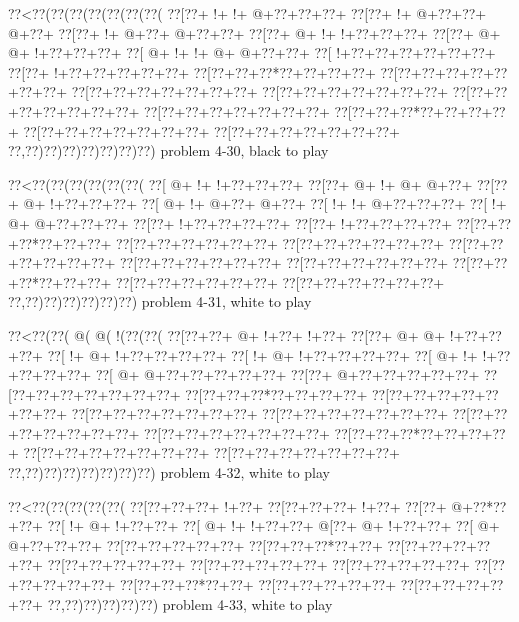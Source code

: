 \vbox{\vbox{\goo
\0??<\0??(\0??(\0??(\0??(\0??(\0??(\0??(
\0??[\0??+\- !+\- !+\- @+\0??+\0??+\0??+
\0??[\0??+\- !+\- @+\0??+\0??+\- @+\0??+
\0??[\0??+\- !+\- @+\0??+\- @+\0??+\0??+
\0??[\0??+\- @+\- !+\- !+\0??+\0??+\0??+
\0??[\0??+\- @+\- @+\- !+\0??+\0??+\0??+
\0??[\- @+\- !+\- !+\- @+\- @+\0??+\0??+
\0??[\- !+\0??+\0??+\0??+\0??+\0??+\0??+
\0??[\0??+\- !+\0??+\0??+\0??+\0??+\0??+
\0??[\0??+\0??+\0??*\0??+\0??+\0??+\0??+
\0??[\0??+\0??+\0??+\0??+\0??+\0??+\0??+
\0??[\0??+\0??+\0??+\0??+\0??+\0??+\0??+
\0??[\0??+\0??+\0??+\0??+\0??+\0??+\0??+
\0??[\0??+\0??+\0??+\0??+\0??+\0??+\0??+
\0??[\0??+\0??+\0??+\0??+\0??+\0??+\0??+
\0??[\0??+\0??+\0??*\0??+\0??+\0??+\0??+
\0??[\0??+\0??+\0??+\0??+\0??+\0??+\0??+
\0??[\0??+\0??+\0??+\0??+\0??+\0??+\0??+
\0??,\0??)\0??)\0??)\0??)\0??)\0??)\0??)
}
\hfil problem 4-30, black to play\hfil\break
}

\vbox{\vbox{\goo
\0??<\0??(\0??(\0??(\0??(\0??(\0??(
\0??[\- @+\- !+\- !+\0??+\0??+\0??+
\0??[\0??+\- @+\- !+\- @+\- @+\0??+
\0??[\0??+\- @+\- !+\0??+\0??+\0??+
\0??[\- @+\- !+\- @+\0??+\- @+\0??+
\0??[\- !+\- !+\- @+\0??+\0??+\0??+
\0??[\- !+\- @+\- @+\0??+\0??+\0??+
\0??[\0??+\- !+\0??+\0??+\0??+\0??+
\0??[\0??+\- !+\0??+\0??+\0??+\0??+
\0??[\0??+\0??+\0??*\0??+\0??+\0??+
\0??[\0??+\0??+\0??+\0??+\0??+\0??+
\0??[\0??+\0??+\0??+\0??+\0??+\0??+
\0??[\0??+\0??+\0??+\0??+\0??+\0??+
\0??[\0??+\0??+\0??+\0??+\0??+\0??+
\0??[\0??+\0??+\0??+\0??+\0??+\0??+
\0??[\0??+\0??+\0??*\0??+\0??+\0??+
\0??[\0??+\0??+\0??+\0??+\0??+\0??+
\0??[\0??+\0??+\0??+\0??+\0??+\0??+
\0??,\0??)\0??)\0??)\0??)\0??)\0??)
}
\hfil problem 4-31, white to play\hfil\break
}

\vbox{\vbox{\goo
\0??<\0??(\0??(\- @(\- @(\- !(\0??(\0??(
\0??[\0??+\0??+\- @+\- !+\0??+\- !+\0??+
\0??[\0??+\- @+\- @+\- !+\0??+\0??+\0??+
\0??[\- !+\- @+\- !+\0??+\0??+\0??+\0??+
\0??[\- !+\- @+\- !+\0??+\0??+\0??+\0??+
\0??[\- @+\- !+\- !+\0??+\0??+\0??+\0??+
\0??[\- @+\- @+\0??+\0??+\0??+\0??+\0??+
\0??[\0??+\- @+\0??+\0??+\0??+\0??+\0??+
\0??[\0??+\0??+\0??+\0??+\0??+\0??+\0??+
\0??[\0??+\0??+\0??*\0??+\0??+\0??+\0??+
\0??[\0??+\0??+\0??+\0??+\0??+\0??+\0??+
\0??[\0??+\0??+\0??+\0??+\0??+\0??+\0??+
\0??[\0??+\0??+\0??+\0??+\0??+\0??+\0??+
\0??[\0??+\0??+\0??+\0??+\0??+\0??+\0??+
\0??[\0??+\0??+\0??+\0??+\0??+\0??+\0??+
\0??[\0??+\0??+\0??*\0??+\0??+\0??+\0??+
\0??[\0??+\0??+\0??+\0??+\0??+\0??+\0??+
\0??[\0??+\0??+\0??+\0??+\0??+\0??+\0??+
\0??,\0??)\0??)\0??)\0??)\0??)\0??)\0??)
}
\hfil problem 4-32, white to play\hfil\break
}

\vbox{\vbox{\goo
\0??<\0??(\0??(\0??(\0??(\0??(
\0??[\0??+\0??+\0??+\- !+\0??+
\0??[\0??+\0??+\0??+\- !+\0??+
\0??[\0??+\- @+\0??*\0??+\0??+
\0??[\- !+\- @+\- !+\0??+\0??+
\0??[\- @+\- !+\- !+\0??+\0??+
\- @[\0??+\- @+\- !+\0??+\0??+
\0??[\- @+\- @+\0??+\0??+\0??+
\0??[\0??+\0??+\0??+\0??+\0??+
\0??[\0??+\0??+\0??*\0??+\0??+
\0??[\0??+\0??+\0??+\0??+\0??+
\0??[\0??+\0??+\0??+\0??+\0??+
\0??[\0??+\0??+\0??+\0??+\0??+
\0??[\0??+\0??+\0??+\0??+\0??+
\0??[\0??+\0??+\0??+\0??+\0??+
\0??[\0??+\0??+\0??*\0??+\0??+
\0??[\0??+\0??+\0??+\0??+\0??+
\0??[\0??+\0??+\0??+\0??+\0??+
\0??,\0??)\0??)\0??)\0??)\0??)
}
\hfil problem 4-33, white to play\hfil\break
}

